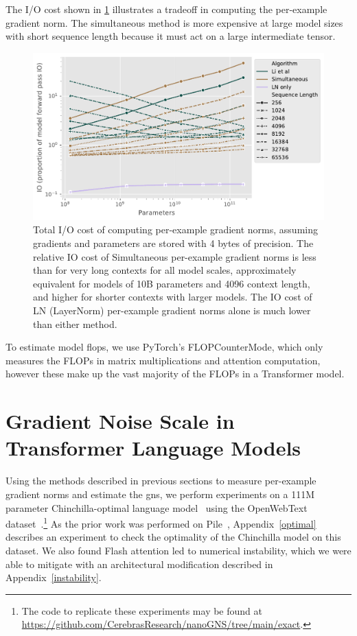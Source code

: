 \documentclass{article}
\begin{document}
The I/O cost shown in \ref{fig:total-gns-io} illustrates a tradeoff in computing
the per-example gradient norm. The simultaneous method is more expensive at
large model sizes with short sequence length because it must act on a large intermediate tensor.

\begin{figure}
    \centering
    \includegraphics[width=0.6\linewidth]{figures/total-io-grads-and-gns.pdf}
    \caption{%
        Total I/O cost of computing per-example gradient norms, assuming
        gradients and parameters are stored with 4 bytes of precision.
        The relative IO cost of Simultaneous per-example gradient norms is
        less than \citet{li2022large} for very long contexts for all model
        scales, approximately equivalent for models of 10B parameters and
        4096 context length, and higher for shorter contexts with larger
        models. The IO cost of LN (LayerNorm) per-example gradient norms alone
        is much lower than either method.}
    \label{fig:total-gns-io}
\end{figure}

To estimate model flops, we use PyTorch's
FLOPCounterMode, which only measures the FLOPs in matrix multiplications and
attention computation, however these make up the vast majority of the FLOPs in
a Transformer model.

\section{Gradient Noise Scale in Transformer Language Models}\label{experiments}


Using the methods described in previous sections to measure per-example gradient
norms and estimate the \ac{gns}, we perform experiments on a 111M parameter
Chinchilla-optimal language model~\citep{dey2023cerebrasgpt,hoffmann2022training} using the
OpenWebText dataset~\citep{gokaslan2019owt}.\footnote{The code to replicate these experiments may be found at \url{https://github.com/CerebrasResearch/nanoGNS/tree/main/exact}.}
As the prior work was performed on
Pile~\citep{gao2020pile}, Appendix~\ref{optimal} describes an experiment to
check the optimality of the Chinchilla model on this dataset. We also found
Flash attention led to numerical instability, which we were able to mitigate with
an architectural modification described in Appendix~\ref{instability}.
\end{document}
